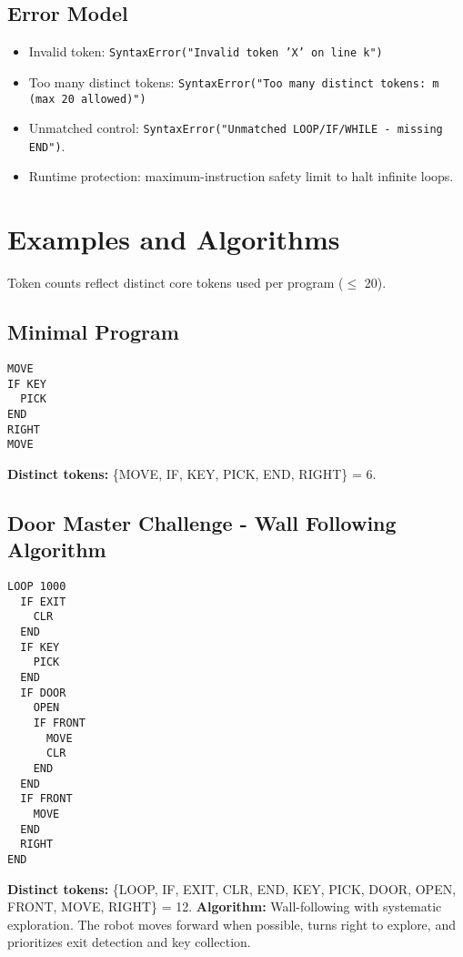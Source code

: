 \documentclass[11pt,a4paper]{article}
\begin{document}
\subsection{Error Model}
\begin{itemize}[noitemsep]
  \item Invalid token: \texttt{SyntaxError("Invalid token 'X' on line k")}
  \item Too many distinct tokens: \texttt{SyntaxError("Too many distinct tokens: m (max 20 allowed)")}
  \item Unmatched control: \texttt{SyntaxError("Unmatched LOOP/IF/WHILE - missing END")}.
  \item Runtime protection: maximum-instruction safety limit to halt infinite loops.
\end{itemize}

\section{Examples and Algorithms}
Token counts reflect distinct core tokens used per program (\(\leq\) 20).

\subsection{Minimal Program}
\begin{lstlisting}[language=vault,caption={Move and attempt to pick a key}]
MOVE
IF KEY
  PICK
END
RIGHT
MOVE
\end{lstlisting}
\textbf{Distinct tokens:} \{MOVE, IF, KEY, PICK, END, RIGHT\} = 6.

\subsection{Door Master Challenge - Wall Following Algorithm}
\begin{lstlisting}[language=vault,caption={Navigate twisting corridor using wall following}]
LOOP 1000
  IF EXIT
    CLR
  END
  IF KEY
    PICK
  END
  IF DOOR
    OPEN
    IF FRONT
      MOVE
      CLR
    END
  END
  IF FRONT
    MOVE
  END
  RIGHT
END
\end{lstlisting}
\textbf{Distinct tokens:} \{LOOP, IF, EXIT, CLR, END, KEY, PICK, DOOR, OPEN, FRONT, MOVE, RIGHT\} = 12.
\textbf{Algorithm:} Wall-following with systematic exploration. The robot moves forward when possible, turns right to explore, and prioritizes exit detection and key collection.
\end{document}
